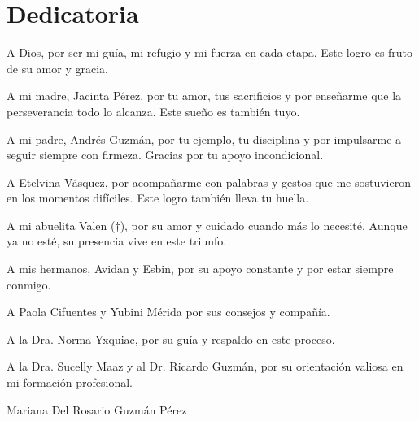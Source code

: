 \chapter*{Dedicatoria}

A Dios, por ser mi guía, mi refugio y mi fuerza en cada etapa. Este logro es
fruto de su amor y gracia.

A mi madre, Jacinta Pérez, por tu amor, tus sacrificios y por enseñarme que la
perseverancia todo lo alcanza. Este sueño es también tuyo.

A mi padre, Andrés Guzmán, por tu ejemplo, tu disciplina y por impulsarme a
seguir siempre con firmeza. Gracias por tu apoyo incondicional.

A Etelvina Vásquez, por acompañarme con palabras y gestos que me sostuvieron en
los momentos difíciles. Este logro también lleva tu huella.

A mi abuelita Valen ($\dagger$), por su amor y cuidado cuando más lo necesité.
Aunque ya no esté, su presencia vive en este triunfo.

A mis hermanos, Avidan y Esbin, por su apoyo constante y por estar siempre
conmigo.

A Paola Cifuentes y Yubini Mérida por sus consejos y compañía.

A la Dra. Norma Yxquiac, por su guía y respaldo en este proceso.

A la Dra. Sucelly Maaz y al Dr. Ricardo Guzmán, por su orientación valiosa en mi
formación profesional.

\vspace{1cm}

\begin{flushright}
Mariana Del Rosario Guzmán Pérez
\end{flushright}
